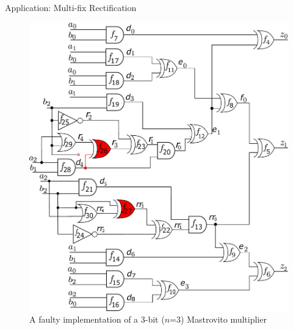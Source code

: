\begin{frame}{\large Application: Multi-fix Rectification}
\begin{figure}[hbt]
\centering
\includegraphics[scale=0.24]{mas_3_ddc_mfr_a.pdf}
\caption*{A faulty implementation of a 3-bit ($n$=3) Mastrovito multiplier
}
\end{figure}
\end{frame}



